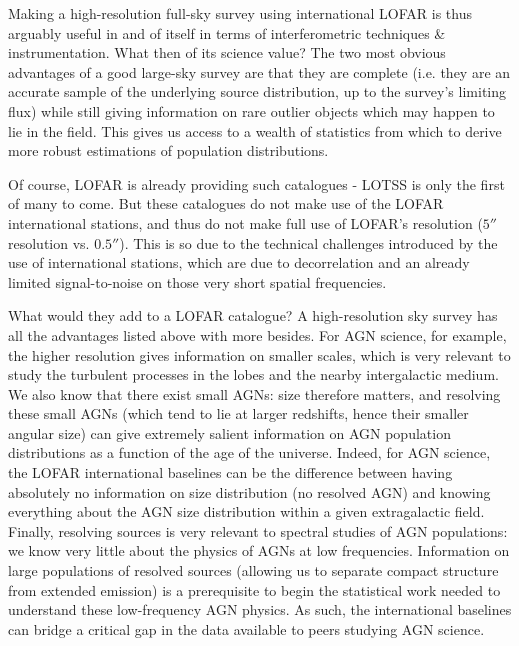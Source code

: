 \pg
Making a high-resolution full-sky survey using international LOFAR is thus arguably useful in and of itself in terms of interferometric techniques \& instrumentation. What then of its science value? The two most obvious advantages of a good large-sky survey are that they are complete (i.e. they are an accurate sample of the underlying source distribution, up to the survey's limiting flux)  while still giving information on rare outlier objects which may happen to lie in the field. This gives us access to a wealth of statistics from which to derive more robust estimations of population distributions. %

\pg
Of course, LOFAR is already providing such catalogues - LOTSS   is only the first of many to come. But these catalogues do not make use of the LOFAR international stations, and thus do not make full use of LOFAR's resolution ($5''$ resolution vs. $0.5''$).  This is so due to the technical challenges introduced by the use of international stations, which are due to decorrelation and an already limited signal-to-noise on those very short spatial frequencies.

\pg
What would they add to a LOFAR catalogue? A high-resolution sky survey has all the advantages listed above with more besides. For AGN science, for example, the higher resolution gives information on smaller scales, which is very relevant to study the turbulent processes in the lobes and the nearby intergalactic medium. We also know that there exist small AGNs: size therefore matters, and resolving these small AGNs (which tend to lie at larger redshifts, hence their smaller angular size) can give extremely salient information on AGN population distributions as a function of the age of the universe. Indeed, for AGN science, the LOFAR international baselines can be the difference between having absolutely no information on size distribution (no resolved AGN) and knowing everything about the AGN size distribution within a given extragalactic field. Finally, resolving sources is very relevant to spectral studies of AGN populations: we know very little about the physics of AGNs at low frequencies. Information on large populations of resolved sources (allowing us to separate compact structure from extended emission) is a prerequisite to begin the statistical work needed to understand these low-frequency AGN physics. As such, the international baselines can bridge a critical gap in the data available to peers studying AGN science.

